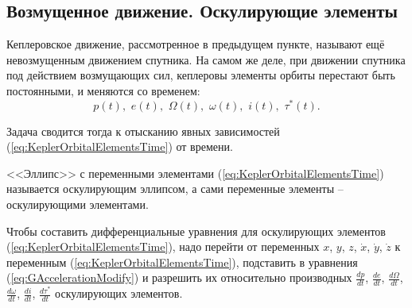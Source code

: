 \subsection{Возмущенное движение. Оскулирующие элементы}
\noindent\indent Кеплеровское движение, рассмотренное в предыдущем пункте, называют
ещё невозмущенным движением спутника. На самом же деле, при движении спутника под
действием возмущающих сил, кеплеровы элементы орбиты перестают быть постоянными,
и меняются со временем:
\begin{equation} \label{eq:KeplerOrbitalElementsTime}
  p(t),\,\, e(t),\,\, \Omega(t),\,\, \omega(t),\,\, i(t),\,\, \tau^*(t).
\end{equation}\par
Задача сводится тогда к отысканию явных зависимостей (\ref{eq:KeplerOrbitalElementsTime})
от времени.\par
<<Эллипс>> с переменными элементами (\ref{eq:KeplerOrbitalElementsTime}) называется
оскулирующим эллипсом, а сами переменные элементы -- оскулирующими элементами.\par
Чтобы составить дифференциальные уравнения для оскулирующих элементов (\ref{eq:KeplerOrbitalElementsTime}),
надо перейти от переменных $x$, $y$, $z$, $\dot{x}$, $\dot{y}$, $\dot{z}$ к переменным
(\ref{eq:KeplerOrbitalElementsTime}), подставить в уравнения (\ref{eq:GAccelerationModify})
и разрешить их относительно производных $\frac{dp}{dt}$, $\frac{de}{dt}$, $\frac{d\Omega}{dt}$,
$\frac{d\omega}{dt}$, $\frac{di}{dt}$, $\frac{d\tau^*}{dt}$ оскулирующих элементов.

